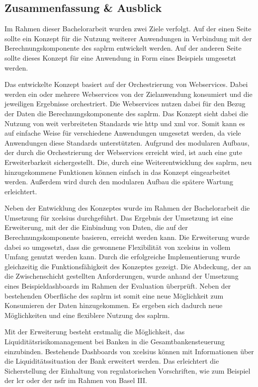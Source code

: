 \begin{onehalfspacing}
\chapter{Zusammenfassung \& Ausblick}

Im Rahmen dieser Bachelorarbeit wurden zwei Ziele verfolgt. Auf der einen Seite sollte ein Konzept für die Nutzung weiterer Anwendungen in Verbindung mit der Berechnungskomponente des \gls{saplrm} entwickelt werden. Auf der anderen Seite sollte dieses Konzept für eine Anwendung in Form eines Beispiels umgesetzt werden. 

Das entwickelte Konzept basiert auf der Orchestrierung von Webservices. Dabei werden ein oder mehrere Webservices von der Zielanwendung konsumiert und die jeweiligen Ergebnisse orchestriert. Die Webservices nutzen dabei für den Bezug der Daten die Berechnungskomponente des \gls{saplrm}. Das Konzept sieht dabei die Nutzung von weit verbreiteten Standards wie \gls{http} und \gls{xml} vor. Somit kann es auf einfache Weise für verschiedene Anwendungen umgesetzt werden, da viele Anwendungen diese Standards unterstützten. Aufgrund des modularen Aufbaus, der durch die Orchestrierung der Webservices erreicht wird, ist auch eine gute Erweiterbarkeit sichergestellt. Die, durch eine Weiterentwicklung des \gls{saplrm}, neu hinzugekommene Funktionen können einfach in das Konzept eingearbeitet werden. Außerdem wird durch den modularen Aufbau die spätere Wartung erleichtert.

Neben der Entwicklung des Konzeptes wurde im Rahmen der Bachelorarbeit die Umsetzung für \gls{xcelsius} durchgeführt. Das Ergebnis der Umsetzung ist eine Erweiterung, mit der die Einbindung von Daten, die auf der Berechnungskomponente basieren, erreicht werden kann. Die Erweiterung wurde dabei so umgesetzt, dass die gewonnene Flexibilität von \gls{xcelsius} in vollem Umfang genutzt werden kann. Durch die erfolgreiche Implementierung wurde gleichzeitig die Funktionsfähigkeit des Konzeptes gezeigt. Die Abdeckung, der an die Zwischenschicht gestellten Anforderungen, wurde anhand der Umsetzung eines Beispieldashboards im Rahmen der Evaluation überprüft. Neben der bestehenden Oberfläche des \gls{saplrm} ist somit eine neue Möglichkeit zum Konsumieren der Daten hinzugekommen. Es ergeben sich dadurch neue Möglichkeiten und eine flexiblere Nutzung des \gls{saplrm}.

Mit der Erweiterung besteht erstmalig die Möglichkeit, das Liquiditätsrisikomanagement bei Banken in die Gesamtbankensteuerung einzubinden. Bestehende Dashboards von \gls{xcelsius} können mit Informationen über die Liquiditätssituation der Bank erweitert werden. Das erleichtert die Sicherstellung der Einhaltung von regulatorischen Vorschriften, wie zum Beispiel der \gls{lcr} oder der \gls{nsfr} im Rahmen von Basel III.


\end{onehalfspacing}
